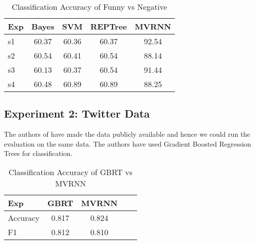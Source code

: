 \documentclass{acm_proc_article-sp}
\begin{document}
\begin{table}[t]
\caption{\label{}Classification Accuracy of Funny vs Negative }

\vspace{8pt} %

\centering
\begin{tabular}{|l |c |c| c| c|}
\hline%
Exp & Bayes & SVM & REPTree & MVRNN  \\
                 
\hline

s1 & 60.37 & 60.36 &60.37 & 92.54 \\
\hline
s2 & 60.54 & 60.41  &60.54 & 88.14 \\
\hline
s3 & 60.13 & 60.37 &60.54 & 91.44\\
\hline
s4 & 60.48 & 60.89 &60.89 & 88.25 \\
\hline



\end{tabular}
\end{table}




\subsection{Experiment 2: Twitter Data}

The authors of \cite{zhang2014recognizing} have made the data publicly available and hence we could run the evaluation on the same data. The authors have used Gradient Boosted Regression Trees for classification. 



\begin{table}[th]
\caption{\label{}Classification Accuracy of GBRT vs MVRNN  }

\vspace{8pt} %

\centering
\begin{tabular}{|l |c |c| c| c|}
\hline%
Exp &  GBRT &  MVRNN  \\
                 
\hline

Accuracy & 0.817 & 0.824 \\
\hline
F1 & 0.812 & 0.810 \\
\hline




\end{tabular}
\end{table}
\end{document}
